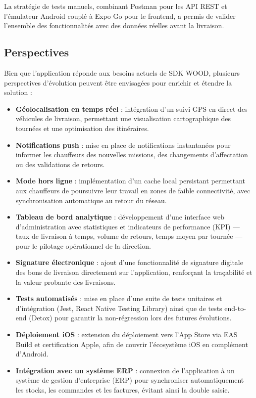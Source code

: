 \documentclass[12pt,a4paper]{article}
\begin{document}
    La stratégie de tests manuels, combinant Postman pour les API REST et l'émulateur Android couplé à Expo Go pour le frontend, a permis de valider l'ensemble des fonctionnalités avec des données réelles avant la livraison.

    \subsection*{Perspectives}

    Bien que l'application réponde aux besoins actuels de SDK WOOD, plusieurs perspectives d'évolution peuvent être envisagées pour enrichir et étendre la solution :

    \begin{itemize}[leftmargin=1.2em]
    \item \textbf{Géolocalisation en temps réel} : intégration d'un suivi GPS en direct des véhicules de livraison, permettant une visualisation cartographique des tournées et une optimisation des itinéraires.

    \item \textbf{Notifications push} : mise en place de notifications instantanées pour informer les chauffeurs des nouvelles missions, des changements d'affectation ou des validations de retours.

    \item \textbf{Mode hors ligne} : implémentation d'un cache local persistant permettant aux chauffeurs de poursuivre leur travail en zones de faible connectivité, avec synchronisation automatique au retour du réseau.

    \item \textbf{Tableau de bord analytique} : développement d'une interface web d'administration avec statistiques et indicateurs de performance (KPI) — taux de livraison à temps, volume de retours, temps moyen par tournée — pour le pilotage opérationnel de la direction.

    \item \textbf{Signature électronique} : ajout d'une fonctionnalité de signature digitale des bons de livraison directement sur l'application, renforçant la traçabilité et la valeur probante des livraisons.

    \item \textbf{Tests automatisés} : mise en place d'une suite de tests unitaires et d'intégration (Jest, React Native Testing Library) ainsi que de tests end-to-end (Detox) pour garantir la non-régression lors des futures évolutions.

    \item \textbf{Déploiement iOS} : extension du déploiement vers l'App Store via EAS Build et certification Apple, afin de couvrir l'écosystème iOS en complément d'Android.

    \item \textbf{Intégration avec un système ERP} : connexion de l'application à un système de gestion d'entreprise (ERP) pour synchroniser automatiquement les stocks, les commandes et les factures, évitant ainsi la double saisie.
    \end{itemize}
\end{document}
